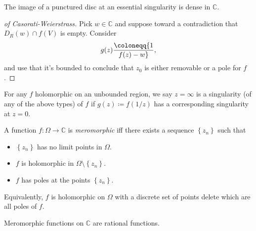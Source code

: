 \begin{slogan}

The image of a punctured disc at an essential singularity is dense in
\({\mathbb{C}}\).

\end{slogan}

\begin{proof}[of Casorati-Weierstrass]

Pick \(w\in {\mathbb{C}}\) and suppose toward a contradiction that
\(D_R(w) \cap f(V)\) is empty. Consider
\begin{align*}
g(z) \coloneqq{1\over f(z) - w}
,\end{align*}
and use that it's bounded to conclude that \(z_0\) is either removable
or a pole for \(f\).

\end{proof}

\begin{definition}

For any \(f\) holomorphic on an unbounded region, we say \(z=\infty\) is
a singularity (of any of the above types) of \(f\) if
\(g(z) \coloneqq f(1/z)\) has a corresponding singularity at \(z=0\).

\end{definition}

\begin{definition}[Meromorphic]

A function \(f:\Omega\to{\mathbb{C}}\) is \emph{meromorphic} iff there
exists a sequence \(\left\{{z_n}\right\}\) such that

\begin{itemize}
\tightlist
\item
  \(\left\{{z_n}\right\}\) has no limit points in \(\Omega\).
\item
  \(f\) is holomorphic in \(\Omega\setminus\left\{{z_n}\right\}\).
\item
  \(f\) has poles at the points \(\left\{{z_n}\right\}\).
\end{itemize}

Equivalently, \(f\) is holomorphic on \(\Omega\) with a discrete set of
points delete which are all poles of \(f\).

\end{definition}

\begin{theorem}

Meromorphic functions on \({\mathbb{C}}\) are rational functions.

\end{theorem}

